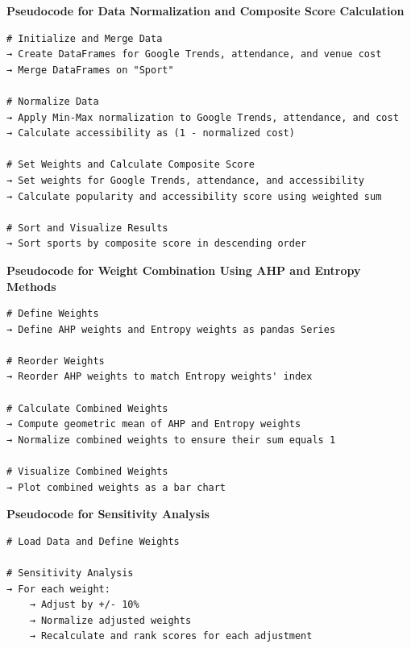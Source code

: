 \documentclass[12pt]{article}
\begin{document}
\noindent \textbf{Pseudocode for Data Normalization and Composite Score Calculation}
\begin{Verbatim}[frame=lines, framesep=3mm, framerule=0.5pt]
# Initialize and Merge Data
→ Create DataFrames for Google Trends, attendance, and venue cost
→ Merge DataFrames on "Sport"

# Normalize Data
→ Apply Min-Max normalization to Google Trends, attendance, and cost
→ Calculate accessibility as (1 - normalized cost)

# Set Weights and Calculate Composite Score
→ Set weights for Google Trends, attendance, and accessibility
→ Calculate popularity and accessibility score using weighted sum

# Sort and Visualize Results
→ Sort sports by composite score in descending order
\end{Verbatim}

\noindent \textbf{Pseudocode for Weight Combination Using AHP and Entropy Methods}
\begin{Verbatim}[frame=lines, framesep=3mm, framerule=0.5pt]
# Define Weights
→ Define AHP weights and Entropy weights as pandas Series

# Reorder Weights
→ Reorder AHP weights to match Entropy weights' index

# Calculate Combined Weights
→ Compute geometric mean of AHP and Entropy weights
→ Normalize combined weights to ensure their sum equals 1

# Visualize Combined Weights
→ Plot combined weights as a bar chart
\end{Verbatim}

\noindent \textbf{Pseudocode for Sensitivity Analysis}
\begin{Verbatim}[frame=lines, framesep=3mm, framerule=0.5pt]
# Load Data and Define Weights

# Sensitivity Analysis
→ For each weight:
    → Adjust by +/- 10%
    → Normalize adjusted weights
    → Recalculate and rank scores for each adjustment

\end{Verbatim}
\end{document}
